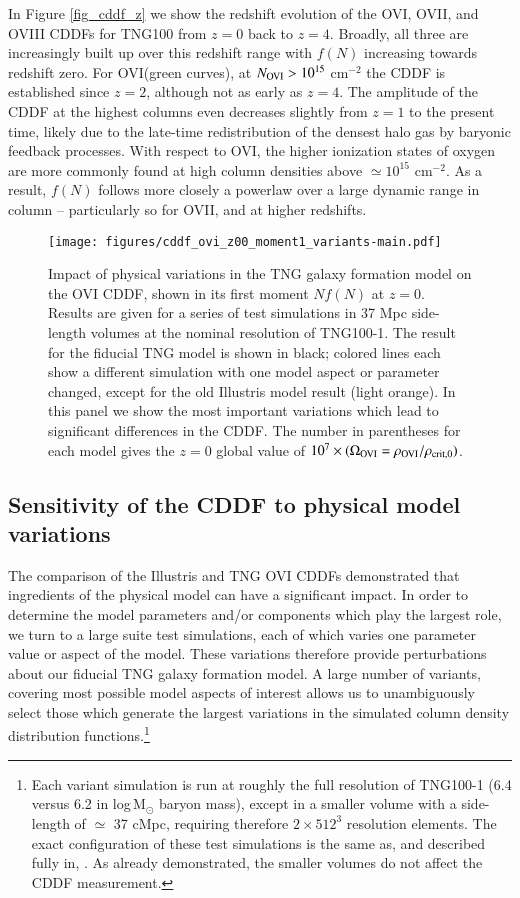 \documentclass[useAMS,usenatbib]{mnras}
\newcommand{\msun}{\,M$_{\odot}$\xspace}
\newcommand{\ovi}{OVI\xspace}
\newcommand{\ovii}{OVII\xspace}
\newcommand{\oviii}{OVIII\xspace}
\begin{document}
In Figure \ref{fig_cddf_z} we show the redshift evolution of the \ovi, \ovii, and \oviii CDDFs for TNG100 from $z=0$ back to $z=4$. Broadly, all three are increasingly built up over this redshift range with $f(N)$ increasing towards redshift zero. For \ovi (green curves), at $N_{\rm OVI} > 10^{15}$ cm$^{-2}$ the CDDF is established since $z=2$, although not as early as $z=4$. The amplitude of the CDDF at the highest columns even decreases slightly from $z=1$ to the present time, likely due to the late-time redistribution of the densest halo gas by baryonic feedback processes. With respect to \ovi, the higher ionization states of oxygen are more commonly found at high column densities above $\simeq 10^{15}$ cm$^{-2}$. As a result, $f(N)$ follows more closely a powerlaw over a large dynamic range in column -- particularly so for \ovii, and at higher redshifts.

\begin{figure}
\centering
\texttt{[image: figures/cddf\_ovi\_z00\_moment1\_variants-main.pdf]}
\caption{ Impact of physical variations in the TNG galaxy formation model on the \ovi CDDF, shown in its first moment $N f(N)$ at $z=0$. Results are given for a series of test simulations in 37 Mpc side-length volumes at the nominal resolution of TNG100-1. The result for the fiducial TNG model is shown in black; colored lines each show a different simulation with one model aspect or parameter changed, except for the old Illustris model result (light orange). In this panel we show the most important variations which lead to significant differences in the CDDF. The number in parentheses for each model gives the $z=0$ global value of $10^7 \times (\Omega_{\rm OVI} = \rho_{\rm OVI} / \rho_{\rm crit,0})$.
 \label{fig_cddf_variants}}
\end{figure}

\subsection{Sensitivity of the CDDF to physical model variations}

The comparison of the Illustris and TNG \ovi CDDFs demonstrated that ingredients of the physical model can have a significant impact. In order to determine the model parameters and/or components which play the largest role, we turn to a large suite test simulations, each of which varies one parameter value or aspect of the model. These variations therefore provide perturbations about our fiducial TNG galaxy formation model. A large number of variants, covering most possible model aspects of interest allows us to unambiguously select those which generate the largest variations in the simulated column density distribution functions.\footnote{Each variant simulation is run at roughly the full resolution of TNG100-1 (6.4 versus 6.2 in log\msun baryon mass), except in a smaller volume with a side-length of $\simeq$ 37 cMpc, requiring therefore $2 \times 512^3$ resolution elements. The exact configuration of these test simulations is the same as, and described fully in, \cite{pillepich17a}. As already demonstrated, the smaller volumes do not affect the CDDF measurement.}
\end{document}
